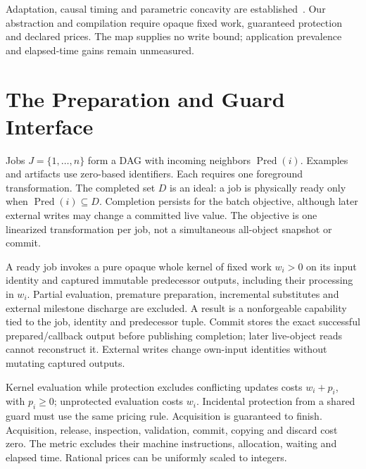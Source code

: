 \documentclass[acmsmall,screen,review,anonymous]{acmart}
\begin{document}
Adaptation, causal timing and parametric concavity are established~\cite{cerny,mannor,postek,bertsimas2003}. Our abstraction and compilation require opaque fixed work, guaranteed protection and declared prices. The map supplies no write bound; application prevalence and elapsed-time gains remain unmeasured.

\section{The Preparation and Guard Interface}
\label{sec:primitives}

Jobs $J=\{1,\ldots,n\}$ form a DAG with incoming neighbors $\operatorname{Pred}(i)$. Examples and artifacts use zero-based identifiers. Each requires one foreground transformation. The completed set $D$ is an ideal: a job is physically ready only when $\operatorname{Pred}(i)\subseteq D$. Completion persists for the batch objective, although later external writes may change a committed live value. The objective is one linearized transformation per job, not a simultaneous all-object snapshot or commit.

A ready job invokes a pure opaque whole kernel of fixed work $w_i>0$ on its input identity and captured immutable predecessor outputs, including their processing in $w_i$. Partial evaluation, premature preparation, incremental substitutes and external milestone discharge are excluded. A result is a nonforgeable capability tied to the job, identity and predecessor tuple. Commit stores the exact successful prepared/callback output before publishing completion; later live-object reads cannot reconstruct it. External writes change own-input identities without mutating captured outputs.

Kernel evaluation while protection excludes conflicting updates costs $w_i+p_i$, with $p_i\ge0$; unprotected evaluation costs $w_i$. Incidental protection from a shared guard must use the same pricing rule. Acquisition is guaranteed to finish. Acquisition, release, inspection, validation, commit, copying and discard cost zero. The metric excludes their machine instructions, allocation, waiting and elapsed time. Rational prices can be uniformly scaled to integers.
\end{document}
